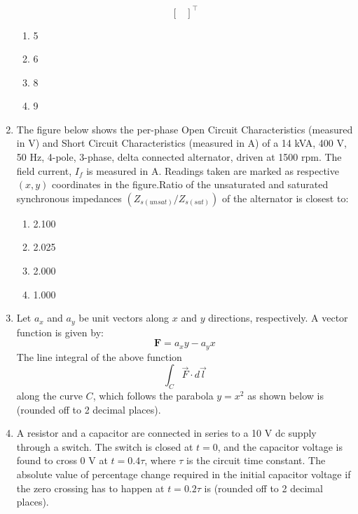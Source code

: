 \documentclass[journal,12pt,onecolumn]{IEEEtran}
\theoremstyle{remark}
\begin{document}
\begin{enumerate}
\[\begin{bmatrix}
\end{bmatrix}^{\top}
\]
    \begin{enumerate}
        \item 5
        \item 6
        \item 8
        \item 9
    \end{enumerate}
    \item The figure below shows the per-phase Open Circuit Characteristics (measured in V) and Short Circuit Characteristics (measured in A) of a 14 kVA, 400 V, 50 Hz, 4-pole, 3-phase, delta connected alternator, driven at 1500 rpm. The field current, $I_f$ is measured in A. Readings taken are marked as respective $(x, y)$ coordinates in the figure.Ratio of the unsaturated and saturated synchronous impedances $(Z_{s(unsat)}/Z_{s(sat)})$ of the alternator is closest to:
      \begin{figure}[H]
        \centering
          
    \end{figure}
    \begin{enumerate}
        \item 2.100
        \item 2.025
        \item 2.000
        \item 1.000
    \end{enumerate}
    \item Let $a_x$ and $a_y$ be unit vectors along $x$ and $y$ directions, respectively. A vector function is given by:
    $$
    \mathbf{F} = a_x y - a_y x
    $$
    The line integral of the above function 
    $$\int_C \vec{F} \cdot d\vec{l}$$
    along the curve $C$, which follows the parabola $y = x^2$ as shown below is {\underline{\hspace{1cm}}} (rounded off to 2 decimal places).
      \begin{figure}[H]
        \centering
         
    \end{figure}
    \item A resistor and a capacitor are connected in series to a 10 V dc supply through a switch. The switch is closed at $t = 0$, and the capacitor voltage is found to cross 0 V at $t=0.4\tau$, where $\tau$ is the circuit time constant. The absolute value of percentage change required in the initial capacitor voltage if the zero crossing has to happen at $t= 0.2\tau$ is {\underline{\hspace{2cm}}} (rounded off to 2 decimal places).
  

\end{enumerate}
\end{document}
